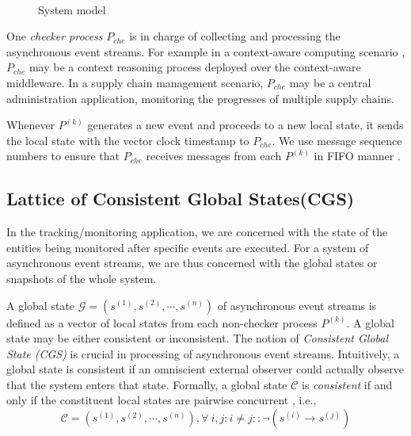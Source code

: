 \documentclass[12pt,journal,letterpaper,compsoc]{IEEEtran}
\begin{document}
\begin{figure}[htbp]
    \hspace*{\fill}
    \\
    \centering\parbox[c]{1.6in}{\caption{System model}}
    \label{F:system model}
\end{figure}

One {\it checker process} $P_{che}$ is in charge of collecting and processing the asynchronous event streams. For example in a context-aware computing scenario \cite{Huang11}, $P_{che}$ may be a context reasoning process deployed over the context-aware middleware. In a supply chain management scenario, $P_{che}$ may be a central administration application, monitoring the progresses of multiple supply chains.

Whenever $P^{(k)}$ generates a new event and proceeds to a new local state, it sends the local state with the vector clock timestamp to $P_{che}$. We use message sequence numbers to ensure that $P_{che}$ receives messages from each $P^{(k)}$ in FIFO manner \cite{Garg94, Garg96, Huang09, Huang11}.

\subsection{Lattice of Consistent Global States(CGS)}
\label{sec:lattice}

In the tracking/monitoring application, we are concerned with the state of the entities being monitored after specific events are executed. For a system of asynchronous event streams, we are thus concerned with the global states or snapshots of the whole system.

A global state $\mathcal{G} = (s^{(1)}, s^{(2)}, \cdots, s^{(n)})$ of asynchronous event streams is defined as a vector of local states from each non-checker process $P^{(k)}$. A global state may be either consistent or inconsistent. The notion of {\it Consistent Global State (CGS)} is crucial in processing of asynchronous event streams. Intuitively, a global state is consistent if an omniscient external observer could actually observe that the system enters that state. Formally, a global state $\mathcal{C}$ is {\it consistent} if and only if the constituent local states are pairwise concurrent \cite{Babaoglu93}, i.e., $$\mathcal{C} = (s^{(1)}, s^{(2)}, \cdots, s^{(n)}), \forall\ i,j : i\neq j :: \neg (s^{(i)}\rightarrow s^{(j)})$$
\end{document}
